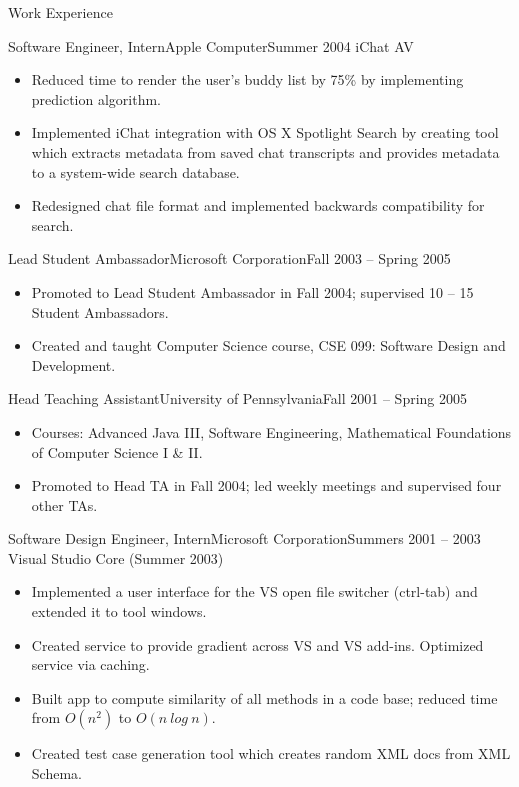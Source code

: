\begin{cvsection}{Work Experience}
	\begin{cvsubsection}{Software Engineer, Intern}{Apple Computer}{Summer 2004}
		iChat AV			
		\begin{itemize}
			\item Reduced time to render the user’s buddy list by 75\% by implementing prediction algorithm.
			\item Implemented iChat integration with OS X Spotlight Search by creating tool which extracts metadata from saved chat transcripts and provides metadata to a system-wide search database.
			\item Redesigned chat file format and implemented backwards compatibility for search.
		\end{itemize}
	\end{cvsubsection}
	
	\begin{cvsubsection}{Lead Student Ambassador}{Microsoft Corporation}{Fall 2003 -- Spring 2005}	
		\begin{itemize}
			\item Promoted to Lead Student Ambassador in Fall 2004; supervised 10 -- 15 Student Ambassadors.
			\item Created and taught Computer Science course, CSE 099: Software Design and Development.
		\end{itemize}
	\end{cvsubsection}
	\begin{cvsubsection}{Head Teaching Assistant}{University of Pennsylvania}{Fall 2001 -- Spring 2005}		
		\begin{itemize}
			\item Courses: Advanced Java III, Software Engineering, Mathematical Foundations of Computer Science I \& II.
			\item Promoted to Head TA in Fall 2004; led weekly meetings and supervised four other TAs.
		\end{itemize}
	\end{cvsubsection}
	
	\begin{cvsubsection}{Software Design Engineer, Intern}{Microsoft Corporation}{Summers 2001 -- 2003}
		Visual Studio Core (Summer 2003)		
		\begin{itemize}
			\item Implemented a user interface for the VS open file switcher (ctrl-tab) and extended it to tool windows.
			\item Created service to provide gradient across VS and VS add-ins. Optimized service via caching.
			\item Built app to compute similarity of all methods in a code base; reduced time from $O(n^2)$ to $O(n\ log\ n)$. 
			\item Created test case generation tool which creates random XML docs from XML Schema.
		\end{itemize}
	\end{cvsubsection}
\end{cvsection}